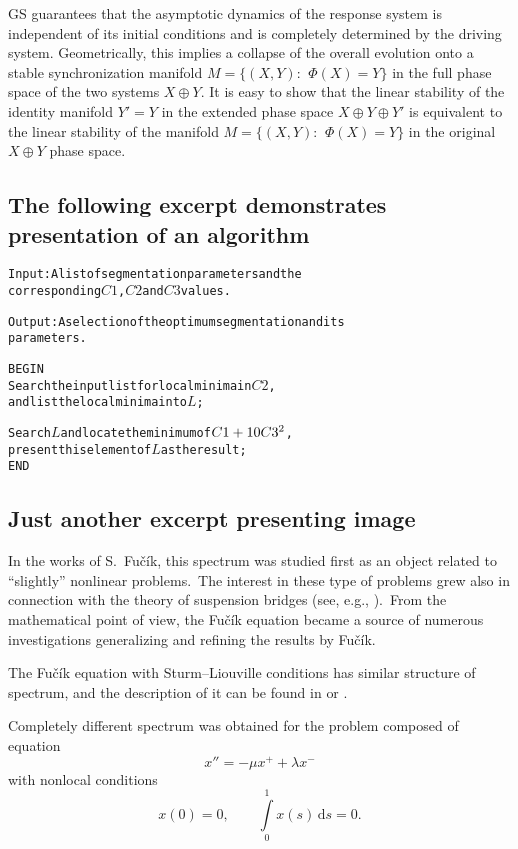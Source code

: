 \documentclass[a4paper, 10pt]{article}
\begin{document}
GS guarantees that the asymptotic dynamics of the response system is independent of its initial conditions and is completely determined by the driving system. Geometrically, this implies a collapse of the overall evolution onto a stable synchronization manifold $M=\{(X,Y){:}\ \,\varPhi(X)=Y\}$ in the full phase space of the two systems $X\oplus Y$. It is easy to show that the linear stability of the identity manifold $Y'=Y$ in the extended phase space $X\oplus Y\oplus Y'$ is equivalent to the linear stability of the manifold $M=\{(X,Y){:}\ \,\varPhi(X)=Y\}$ in the original $X \oplus Y$ phase space.

\subsection{The following excerpt demonstrates presentation of an algorithm}\label{s:2.2}
%
{\small
\begin{alltt}
Input: A list of segmentation parameters and the
       corresponding \(C1\), \(C2\) and \(C3\) values.

Output: A selection of the optimum segmentation and its
       parameters.

 BEGIN
       Search the input list for local minima in \(C2\),
       and list the local minima into \(L\);

       Search \(L\) and locate the minimum of \(C1 + 10 C3\sp{2}\),
       present this element of \(L\) as the result;
 END
\end{alltt}}

\subsection{Just another excerpt presenting image}\label{s:2.3}

In the works of S.\ Fu\v{c}\'ik, this spectrum was studied first as an object related to ``slightly'' nonlinear problems.\ The interest in these type of problems grew also in connection with the theory of suspension bridges (see, e.g., \cite{LazerSIAM}).\ From the mathematical point of view, the Fu\v{c}\'ik equation became a source of numerous investigations generalizing and refining the results by Fu\v{c}\'ik.

The Fu\v{c}\'ik equation with Sturm--Liouville conditions has similar structure of spectrum, and the description of it can be found in \cite{dancer} or \cite{Fucik}.

Completely different spectrum was obtained for the problem composed of equation
%
\begin{equation} \label{eq:4}
x''=-\mu x^{+}+\lambda x^{-}
\end{equation}
%
with nonlocal conditions
%
\begin{equation} \label{eq:5}
x(0)=0, \qquad \int\limits_0^1 x(s)\,\mathrm{d}s=0.
\end{equation}
%
\end{document}
